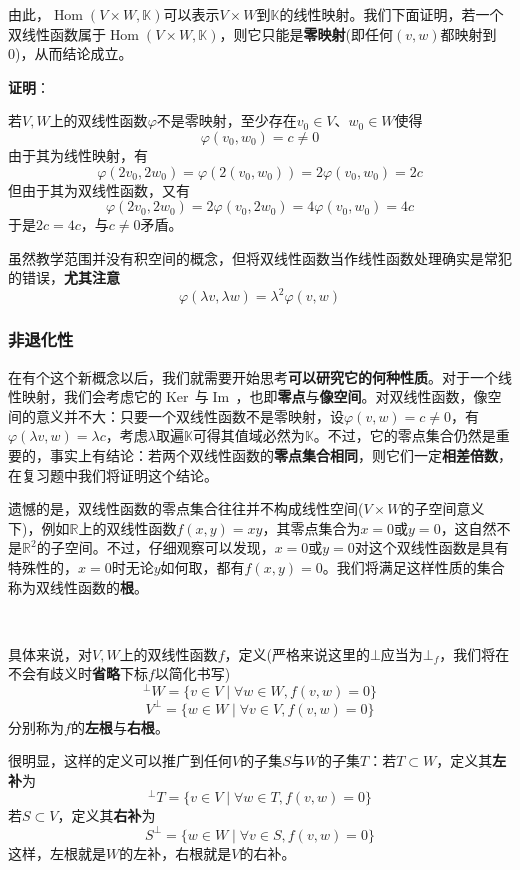 \documentclass[a4paper,UTF8,fontset=windows,AutoFakeBold]{ctexart}
\DeclareMathOperator{\im}{Im\,}
\DeclareMathOperator{\Ker}{Ker\,}
\DeclareMathOperator{\Hom}{Hom}
\newcommand*{\note}{\noindent *}
\newcommand{\proo}[1]{{\vspace{5pt}\kaishu\noindent\textbf{证明}：\vspace{-3pt}
\begin{compactitem}
    \item[] #1
\end{compactitem}
}}
\begin{document}
由此，$\Hom(V\times W,\mathbb{K})$可以表示$V\times W$到$\mathbb{K}$的线性映射。我们下面证明，若一个双线性函数属于$\Hom(V\times W,\mathbb{K})$，则它只能是\textbf{零映射}(即任何$(v,w)$都映射到0)，从而结论成立。

\proo{
    若$V,W$上的双线性函数$\varphi$不是零映射，至少存在$v_0\in V$、$w_0\in W$使得
    $$\varphi(v_0,w_0)=c\ne0$$
    由于其为线性映射，有
    $$\varphi(2v_0,2w_0)=\varphi(2(v_0,w_0))=2\varphi(v_0,w_0)=2c$$
    但由于其为双线性函数，又有
    $$\varphi(2v_0,2w_0)=2\varphi(v_0,2w_0)=4\varphi(v_0,w_0)=4c$$
    于是$2c=4c$，与$c\ne0$矛盾。
}

\note 虽然教学范围并没有积空间的概念，但将双线性函数当作线性函数处理确实是常犯的错误，\textbf{尤其注意}
$$\varphi(\lambda v,\lambda w)=\lambda^2\varphi(v,w)$$

\subsubsection{非退化性}
在有个这个新概念以后，我们就需要开始思考\textbf{可以研究它的何种性质}。对于一个线性映射，我们会考虑它的$\Ker$与$\im$，也即\textbf{零点}与\textbf{像空间}。对双线性函数，像空间的意义并不大：只要一个双线性函数不是零映射，设$\varphi(v,w)=c\ne0$，有$\varphi(\lambda v,w)=\lambda c$，考虑$\lambda$取遍$\mathbb{K}$可得其值域必然为$\mathbb{K}$。不过，它的零点集合仍然是重要的，事实上有结论：若两个双线性函数的\textbf{零点集合相同}，则它们一定\textbf{相差倍数}，在复习题中我们将证明这个结论。

遗憾的是，双线性函数的零点集合往往并不构成线性空间($V\times W$的子空间意义下)，例如$\mathbb{R}$上的双线性函数$f(x,y)=xy$，其零点集合为$x=0$或$y=0$，这自然不是$\mathbb{R}^2$的子空间。不过，仔细观察可以发现，$x=0$或$y=0$对这个双线性函数是具有特殊性的，$x=0$时无论$y$如何取，都有$f(x,y)=0$。我们将满足这样性质的集合称为双线性函数的\textbf{根}。

\

具体来说，对$V,W$上的双线性函数$f$，定义(严格来说这里的$\bot$应当为$\bot_f$，我们将在不会有歧义时\textbf{省略}下标$f$以简化书写)
$$^\bot W=\{v\in V\mid\forall w\in W,f(v,w)=0\}$$
$$V^\bot=\{w\in W\mid\forall v\in V,f(v,w)=0\}$$
分别称为$f$的\textbf{左根}与\textbf{右根}。

很明显，这样的定义可以推广到任何$V$的子集$S$与$W$的子集$T$：若$T\subset W$，定义其\textbf{左补}为
$$^\bot T=\{v\in V\mid\forall w\in T,f(v,w)=0\}$$
若$S\subset V$，定义其\textbf{右补}为
$$S^\bot=\{w\in W\mid\forall v\in S,f(v,w)=0\}$$
这样，左根就是$W$的左补，右根就是$V$的右补。
\end{document}
